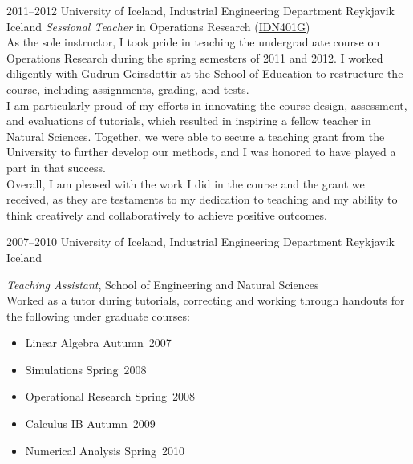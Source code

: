 \documentclass[]{cv} %
\begin{document}
\begin{entrylist}
    \entry
    {2011--2012}
    {University of Iceland, Industrial Engineering Department}
    {Reykjavik Iceland}
    {\emph{Sessional Teacher} in Operations Research (\href{https://ugla.hi.is/kennsluskra/index.php?sid=&tab=nam&chapter=namskeid&id=08213020110}{IDN401G})\\
    As the sole instructor, I took pride in teaching the undergraduate course on Operations Research during the spring semesters of 2011 and 2012. I worked diligently with Gudrun Geirsdottir at the School of Education to restructure the course, including assignments, grading, and tests.\\
    I am particularly proud of my efforts in innovating the course design, assessment, and evaluations of tutorials, which resulted in inspiring a fellow teacher in Natural Sciences. Together, we were able to secure a teaching grant from the University to further develop our methods, and I was honored to have played a part in that success.\\
    Overall, I am pleased with the work I did in the course and the grant we received, as they are testaments to my dedication to teaching and my ability to think creatively and collaboratively to achieve positive outcomes.
    }

    \entry
    {2007--2010}
    {University of Iceland, Industrial Engineering Department}
    {Reykjavik Iceland}
    {\emph{Teaching Assistant}, School of Engineering and 
    Natural Sciences \\
        Worked as a tutor during tutorials, correcting and working through 
        handouts for the following under graduate courses: 
        \begin{itemize}
            \item Linear Algebra 		\hfill Autumn~2007
            \item Simulations			\hfill Spring~2008
            \item Operational Research 	\hfill Spring~2008
            \item Calculus IB			\hfill Autumn~2009
            \item Numerical Analysis 	\hfill Spring~2010
        \end{itemize}	
    }
\end{entrylist}   
\end{document}
